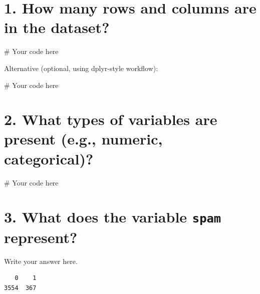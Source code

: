 \documentclass[
  letterpaper,
  DIV=11,
  numbers=noendperiod]{scrreprt}
\newenvironment{Shaded}{\begin{snugshade}}{\end{snugshade}}
\newcommand{\CommentTok}[1]{\textcolor[rgb]{0.37,0.37,0.37}{#1}}
\newcommand{\FunctionTok}[1]{\textcolor[rgb]{0.28,0.35,0.67}{#1}}
\newcommand{\NormalTok}[1]{\textcolor[rgb]{0.00,0.23,0.31}{#1}}
\newcommand{\SpecialCharTok}[1]{\textcolor[rgb]{0.37,0.37,0.37}{#1}}
\begin{document}
\section{1. How many rows and columns are in the
dataset?}\label{how-many-rows-and-columns-are-in-the-dataset}

\begin{Shaded}
\begin{Highlighting}[]
\CommentTok{\# Your code here}
\end{Highlighting}
\end{Shaded}

Alternative (optional, using dplyr-style workflow):

\begin{Shaded}
\begin{Highlighting}[]
\CommentTok{\# Your code here}
\end{Highlighting}
\end{Shaded}

\section{2. What types of variables are present (e.g., numeric,
categorical)?}\label{what-types-of-variables-are-present-e.g.-numeric-categorical}

\begin{Shaded}
\begin{Highlighting}[]
\CommentTok{\# Your code here}
\end{Highlighting}
\end{Shaded}

\section{\texorpdfstring{3. What does the variable \texttt{spam}
represent?}{3. What does the variable spam represent?}}\label{what-does-the-variable-spam-represent}

Write your answer here.

\begin{Shaded}
\end{Shaded}

\begin{verbatim}
   0    1 
3554  367 
\end{verbatim}
\end{document}
